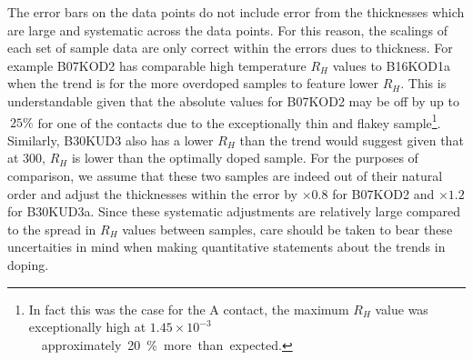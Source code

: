 The error bars on the data points do not include error from the thicknesses which are large and systematic across the data points. For this reason, the scalings of each set of sample data are only correct within the errors dues to thickness. For example B07KOD2 has comparable high temperature $R_H$ values to B16KOD1a when the trend is for the more overdoped samples to feature lower $R_H$. This is understandable given that the absolute values for B07KOD2 may be off by up to $~25\%$ for one of the contacts due to the exceptionally thin and flakey sample\footnote{In fact this was the case for the A contact, the maximum $R_H$ value was exceptionally high at \unit{$1.45\times10^{-3}$}{\centi\metre\cubed} approximately \unit{20}{\%} more than expected.}. Similarly, B30KUD3 also has a lower $R_H$ than the trend would suggest given that at \unit{300}{\kelvin}, $R_H$ is lower than the optimally doped sample. For the purposes of comparison, we assume that these two samples are indeed out of their natural order and adjust the thicknesses within the error by $\times0.8$ for B07KOD2 and $\times1.2$ for B30KUD3a. Since these systematic adjustments are relatively large compared to the spread in $R_H$ values between samples,  care should be taken to bear these uncertaities in mind when making quantitative statements about the trends in doping.

